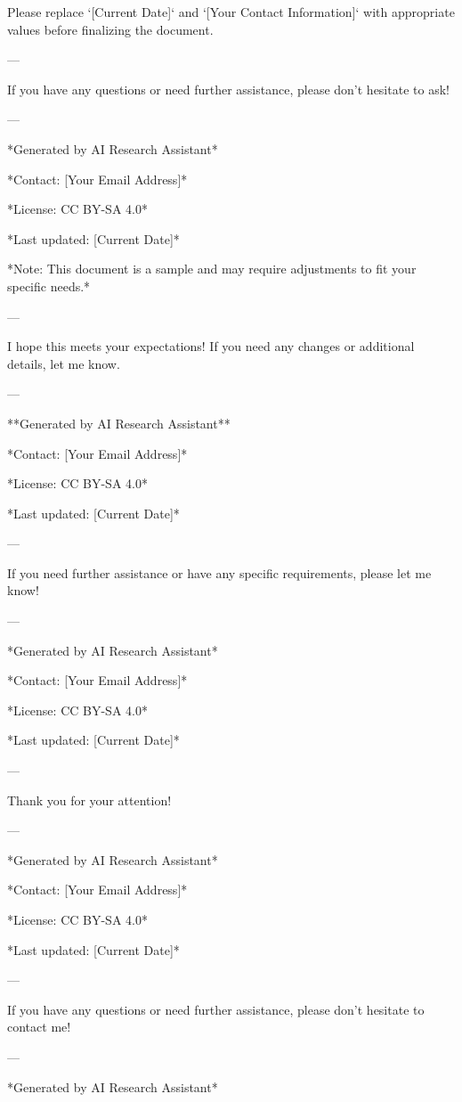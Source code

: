 Please replace `[Current Date]` and `[Your Contact Information]` with appropriate values before finalizing the document. 

---

If you have any questions or need further assistance, please don't hesitate to ask! 

--- 

*Generated by AI Research Assistant* 

*Contact: [Your Email Address]* 

*License: CC BY-SA 4.0* 

*Last updated: [Current Date]* 

*Note: This document is a sample and may require adjustments to fit your specific needs.* 

---

I hope this meets your expectations! If you need any changes or additional details, let me know. 

--- 

**Generated by AI Research Assistant** 

*Contact: [Your Email Address]* 

*License: CC BY-SA 4.0* 

*Last updated: [Current Date]* 

--- 

If you need further assistance or have any specific requirements, please let me know! 

--- 

*Generated by AI Research Assistant* 

*Contact: [Your Email Address]* 

*License: CC BY-SA 4.0* 

*Last updated: [Current Date]* 

--- 

Thank you for your attention! 

--- 

*Generated by AI Research Assistant* 

*Contact: [Your Email Address]* 

*License: CC BY-SA 4.0* 

*Last updated: [Current Date]* 

--- 

If you have any questions or need further assistance, please don't hesitate to contact me! 

--- 

*Generated by AI Research Assistant* 

